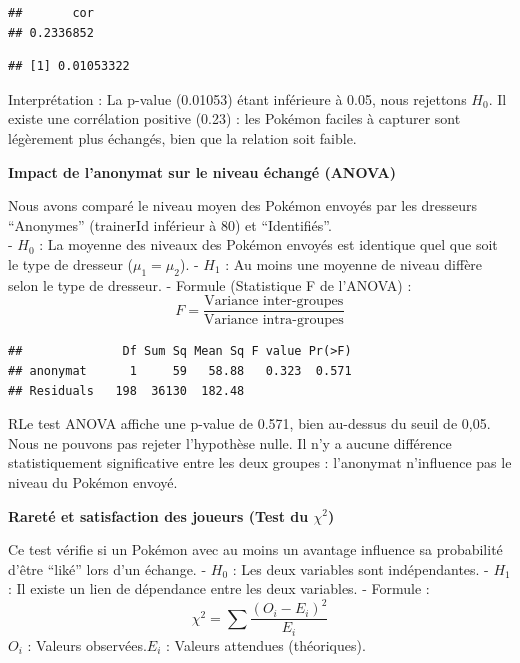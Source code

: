 \documentclass[mstat,12pt]{unswthesis}
\begin{document}
\begin{verbatim}
##       cor 
## 0.2336852
\end{verbatim}

\begin{verbatim}
## [1] 0.01053322
\end{verbatim}

\bigskip

Interprétation : La p-value (0.01053) étant inférieure à 0.05, nous
rejettons \(H_0\). Il existe une corrélation positive (0.23) : les
Pokémon faciles à capturer sont légèrement plus échangés, bien que la
relation soit faible.

\bigskip

\textbf{Impact de l'anonymat sur le niveau échangé (ANOVA)}

\bigskip

Nous avons comparé le niveau moyen des Pokémon envoyés par les dresseurs
``Anonymes'' (trainerId inférieur à 80) et ``Identifiés''.\\
- \(H_0\) : La moyenne des niveaux des Pokémon envoyés est identique
quel que soit le type de dresseur (\(\mu_1 = \mu_2\)). - \(H_1\) : Au
moins une moyenne de niveau diffère selon le type de dresseur. - Formule
(Statistique F de l'ANOVA)
:\[F = \frac{\text{Variance inter-groupes}}{\text{Variance intra-groupes}}\]

\bigskip

\begin{verbatim}
##              Df Sum Sq Mean Sq F value Pr(>F)
## anonymat      1     59   58.88   0.323  0.571
## Residuals   198  36130  182.48
\end{verbatim}

\bigskip

RLe test ANOVA affiche une p-value de 0.571, bien au-dessus du seuil de
0,05. Nous ne pouvons pas rejeter l'hypothèse nulle. Il n'y a aucune
différence statistiquement significative entre les deux groupes :
l'anonymat n'influence pas le niveau du Pokémon envoyé.

\bigskip

\textbf{Rareté et satisfaction des joueurs (Test du \(\chi^2\))}

\bigskip

Ce test vérifie si un Pokémon avec au moins un avantage influence sa
probabilité d'être ``liké'' lors d'un échange. - \(H_0\) : Les deux
variables sont indépendantes. - \(H_1\) : Il existe un lien de
dépendance entre les deux variables. - Formule
:\[\chi^2 = \sum \frac{(O_i - E_i)^2}{E_i}\]\(O_i\) : Valeurs
observées.\(E_i\) : Valeurs attendues (théoriques).
\end{document}
